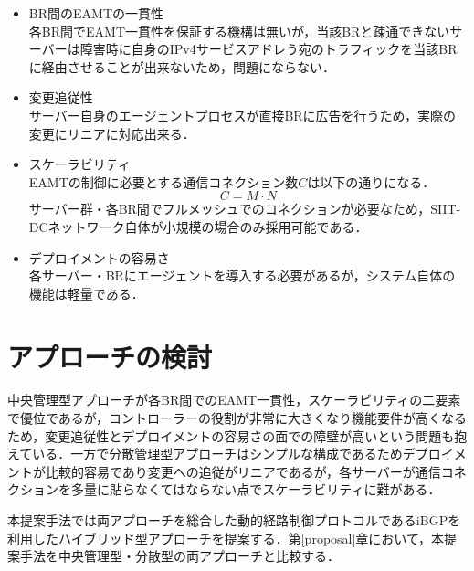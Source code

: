 \begin{itemize}
    \item BR間のEAMTの一貫性 \\
    各BR間でEAMT一貫性を保証する機構は無いが，当該BRと疎通できないサーバーは障害時に自身のIPv4サービスアドレう宛のトラフィックを当該BRに経由させることが出来ないため，問題にならない．
    \item 変更追従性 \\
    サーバー自身のエージェントプロセスが直接BRに広告を行うため，実際の変更にリニアに対応出来る．
    \item スケーラビリティ　\\
    EAMTの制御に必要とする通信コネクション数$C$は以下の通りになる．
    \begin{equation}
        C =  M \cdot N 
    \end{equation}
    サーバー群・各BR間でフルメッシュでのコネクションが必要なため，SIIT-DCネットワーク自体が小規模の場合のみ採用可能である．

    \item デプロイメントの容易さ　\\
    各サーバー・BRにエージェントを導入する必要があるが，システム自体の機能は軽量である．
\end{itemize}

\section{アプローチの検討}

中央管理型アプローチが各BR間でのEAMT一貫性，スケーラビリティの二要素で優位であるが，コントローラーの役割が非常に大きくなり機能要件が高くなるため，変更追従性とデプロイメントの容易さの面での障壁が高いという問題も抱えている．一方で分散管理型アプローチはシンプルな構成であるためデプロイメントが比較的容易であり変更への追従がリニアであるが，各サーバーが通信コネクションを多量に貼らなくてはならない点でスケーラビリティに難がある．

本提案手法では両アプローチを総合した動的経路制御プロトコルであるiBGPを利用したハイブリッド型アプローチを提案する．第\ref{proposal}章において，本提案手法を中央管理型・分散型の両アプローチと比較する．


